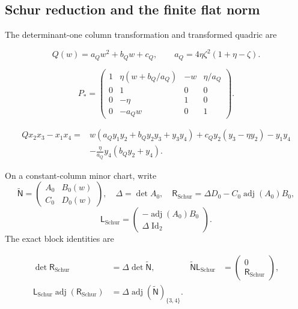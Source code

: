 \subsection{Schur reduction and the finite flat norm}

The determinant-one column transformation and transformed quadric are

\begin{equation}\label{supp:r3:Qcoefficients}
Q(w)=a_Qw^2+b_Qw+c_Q,\qquad
a_Q=4\eta \zeta ^2(1+\eta -\zeta ).
\end{equation}

\begin{equation}\label{supp:r3:columntransform}
P_*=
\begin{pmatrix}
1&\eta (w+b_Q/a_Q)&-w&\eta /a_Q\\
0&1&0&0\\
0&-\eta &1&0\\
0&-a_Qw&0&1
\end{pmatrix}.
\end{equation}

\begin{equation}\label{supp:r3:transformedmomentquadric}
\begin{aligned}
Qx_2x_3-x_1x_4
={}&w(a_Qy_1y_2+b_Qy_2y_3+y_3y_4)
  +c_Qy_2(y_3-\eta y_2)-y_1y_4\\
 &-\frac{\eta }{a_Q}y_4(b_Qy_2+y_4).
\end{aligned}
\end{equation}

On a constant-column minor chart, write
\[
 \widetilde{\mathsf N}=\begin{pmatrix}A_0&B_0(w)\\C_0&D_0(w)\end{pmatrix},
 \quad\Delta=\det A_0,\quad
 \mathsf R_{\mathrm{Schur}}=\Delta D_0-C_0\operatorname{adj}(A_0)B_0,
\]
\[
 \mathsf L_{\mathrm{Schur}}=
       \begin{pmatrix}-\operatorname{adj}(A_0)B_0\\\Delta\operatorname{Id}_2\end{pmatrix}.
\]
The exact block identities are

\begin{align}
 \det\mathsf R_{\mathrm{Schur}}&=\Delta\det\widetilde{\mathsf N},
 &\widetilde{\mathsf N}\mathsf L_{\mathrm{Schur}}&=\begin{pmatrix}0\\\mathsf R_{\mathrm{Schur}}\end{pmatrix},
 \label{supp:r3schur:basic}\\
 \mathsf L_{\mathrm{Schur}}\operatorname{adj}(\mathsf R_{\mathrm{Schur}})
 &=\Delta\operatorname{adj}(\widetilde{\mathsf N})_{\{3,4\}}.
 \label{supp:r3schur:columns}
\end{align}

